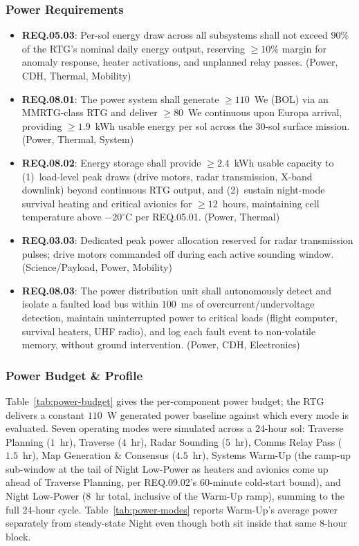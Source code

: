 \documentclass[11pt]{article}
\newcommand{\reqid}[1]{\textbf{#1}}
\begin{document}
\subsubsection{Power Requirements}
\begin{itemize}[leftmargin=*]
    \item \reqid{REQ.05.03}: Per-sol energy draw across all subsystems shall not exceed
    $90\%$ of the RTG's nominal daily energy output, reserving $\geq 10\%$ margin for anomaly
    response, heater activations, and unplanned relay passes. (Power, CDH, Thermal, Mobility)
    \item \reqid{REQ.08.01}: The power system shall generate $\geq 110$~We (BOL) via an
    MMRTG-class RTG and deliver $\geq 80$~We continuous upon Europa arrival, providing
    $\geq 1.9$~kWh usable energy per sol across the 30-sol surface mission. (Power, Thermal,
    System)
    \item \reqid{REQ.08.02}: Energy storage shall provide $\geq 2.4$~kWh usable capacity to
    (1)~load-level peak draws (drive motors, radar transmission, X-band downlink) beyond
    continuous RTG output, and (2)~sustain night-mode survival heating and critical avionics for
    $\geq 12$~hours, maintaining cell temperature above $-20^\circ$C per REQ.05.01. (Power,
    Thermal)
    \item \reqid{REQ.03.03}: Dedicated peak power allocation reserved for radar transmission
    pulses; drive motors commanded off during each active sounding window. (Science/Payload,
    Power, Mobility)
    \item \reqid{REQ.08.03}: The power distribution unit shall autonomously detect and
    isolate a faulted load bus within $100$~ms of overcurrent/undervoltage detection, maintain
    uninterrupted power to critical loads (flight computer, survival heaters, UHF radio), and
    log each fault event to non-volatile memory, without ground intervention. (Power, CDH,
    Electronics)
\end{itemize}

\subsubsection{Power Budget \& Profile}
Table~\ref{tab:power-budget} gives the per-component power budget; the RTG delivers a constant
$110$~W generated power baseline against which every mode is evaluated. Seven operating modes
were simulated across a 24-hour sol: Traverse Planning ($1$~hr), Traverse ($4$~hr), Radar
Sounding ($5$~hr), Comms Relay Pass ($1.5$~hr), Map Generation \& Consensus ($4.5$~hr), Systems
Warm-Up (the ramp-up sub-window at the tail of Night Low-Power as heaters and avionics come up
ahead of Traverse Planning, per REQ.09.02's $60$-minute cold-start bound), and Night Low-Power
($8$~hr total, inclusive of the Warm-Up ramp), summing to the full 24-hour cycle.
Table~\ref{tab:power-modes} reports Warm-Up's average power separately from steady-state Night
even though both sit inside that same 8-hour block.
\end{document}
